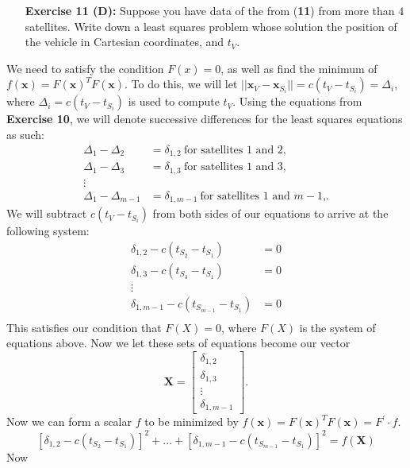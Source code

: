 \documentclass[11pt]{article}
\theoremstyle{definition}
\newcommand{\1}[1]{\mathbf{1} \left \{ #1 \right \}}
\begin{document}
\begin{itemize}
\item[{\textbf{Exercise 11 (D):}}] Suppose you have data of the from (\textbf{11}) from more than $4$ satellites.  Write down a least squares problem whose solution the position of the vehicle in Cartesian coordinates, and $t_V$.
\end{itemize}
We need to satisfy the condition $F(x) = 0$, as well as find the minimum of \(f(\textbf{x}) = F(\textbf{x})^T F(\textbf{x})\).  To do this, we will let \(||\textbf{x}_V - \textbf{x}_{S_i}|| = c(t_V - t_{S_i}) = \Delta_i\), where \(\Delta_i = c(t_V - t_{S_i})\) is used to compute $t_V$.  Using the equations from \textbf{Exercise 10}, we will denote successive differences for the least squares equations as such:
\begin{align*}
    \Delta_1 - \Delta_2 &= \delta_{1,2} \ \text{for satellites 1 and 2,} \\
    \Delta_1 - \Delta_3 &= \delta_{1,3} \ \text{for satellites 1 and 3,} \\
    \vdots \\
    \Delta_1 - \Delta_{m-1} &= \delta_{1,m-1} \ \text{for satellites 1 and $m-1$,}.
\end{align*}
We will subtract $c(t_V - t_{S_i})$ from both sides of our equations to arrive at the following system:
\begin{align*}
    \delta_{1,2} - c(t_{S_2} - t_{S_1}) &= 0 \\
    \delta_{1,3} - c(t_{S_3} - t_{S_1}) &= 0 \\
    \vdots \\
    \delta_{1,m-1} - c(t_{S_{m-1}} - t_{S_1}) &= 0 \\
\end{align*}
This satisfies our condition that $F(X) = 0$, where $F(X)$ is the system of equations above.  Now we let these sets of equations become our vector
\[\textbf{X} = \begin{bmatrix}
\delta_{1,2} \\ \delta_{1,3} \\ \vdots \\ \delta_{1,m-1} \end{bmatrix}.\]
Now we can form a scalar $f$ to be minimized by \(f(\textbf{x}) = F(\textbf{x})^T F(\textbf{x}) = F^{\prime} \cdot f\).
\[[\delta_{1,2} - c(t_{S_2} - t_{S_1})]^2 + ... + [\delta_{1,m-1} - c(t_{S_{m-1}} - t_{S_1})]^2 = f(\textbf{X})\]
Now
\end{document}
